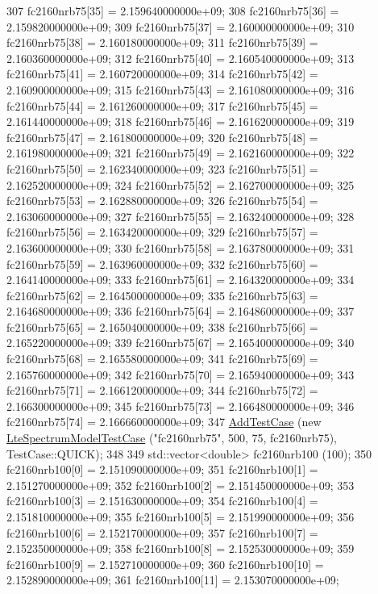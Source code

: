 \begin{DoxyCode}
307   fc2160nrb75[35] = 2.159640000000e+09;
308   fc2160nrb75[36] = 2.159820000000e+09;
309   fc2160nrb75[37] = 2.160000000000e+09;
310   fc2160nrb75[38] = 2.160180000000e+09;
311   fc2160nrb75[39] = 2.160360000000e+09;
312   fc2160nrb75[40] = 2.160540000000e+09;
313   fc2160nrb75[41] = 2.160720000000e+09;
314   fc2160nrb75[42] = 2.160900000000e+09;
315   fc2160nrb75[43] = 2.161080000000e+09;
316   fc2160nrb75[44] = 2.161260000000e+09;
317   fc2160nrb75[45] = 2.161440000000e+09;
318   fc2160nrb75[46] = 2.161620000000e+09;
319   fc2160nrb75[47] = 2.161800000000e+09;
320   fc2160nrb75[48] = 2.161980000000e+09;
321   fc2160nrb75[49] = 2.162160000000e+09;
322   fc2160nrb75[50] = 2.162340000000e+09;
323   fc2160nrb75[51] = 2.162520000000e+09;
324   fc2160nrb75[52] = 2.162700000000e+09;
325   fc2160nrb75[53] = 2.162880000000e+09;
326   fc2160nrb75[54] = 2.163060000000e+09;
327   fc2160nrb75[55] = 2.163240000000e+09;
328   fc2160nrb75[56] = 2.163420000000e+09;
329   fc2160nrb75[57] = 2.163600000000e+09;
330   fc2160nrb75[58] = 2.163780000000e+09;
331   fc2160nrb75[59] = 2.163960000000e+09;
332   fc2160nrb75[60] = 2.164140000000e+09;
333   fc2160nrb75[61] = 2.164320000000e+09;
334   fc2160nrb75[62] = 2.164500000000e+09;
335   fc2160nrb75[63] = 2.164680000000e+09;
336   fc2160nrb75[64] = 2.164860000000e+09;
337   fc2160nrb75[65] = 2.165040000000e+09;
338   fc2160nrb75[66] = 2.165220000000e+09;
339   fc2160nrb75[67] = 2.165400000000e+09;
340   fc2160nrb75[68] = 2.165580000000e+09;
341   fc2160nrb75[69] = 2.165760000000e+09;
342   fc2160nrb75[70] = 2.165940000000e+09;
343   fc2160nrb75[71] = 2.166120000000e+09;
344   fc2160nrb75[72] = 2.166300000000e+09;
345   fc2160nrb75[73] = 2.166480000000e+09;
346   fc2160nrb75[74] = 2.166660000000e+09;
347   \hyperlink{classns3_1_1TestCase_a3718088e3eefd5d6454569d2e0ddd835}{AddTestCase} (\textcolor{keyword}{new} \hyperlink{classLteSpectrumModelTestCase}{LteSpectrumModelTestCase} (\textcolor{stringliteral}{"fc2160nrb75"}, 500, 75, 
      fc2160nrb75), TestCase::QUICK);
348 
349   std::vector<double> fc2160nrb100 (100);
350   fc2160nrb100[0] = 2.151090000000e+09;
351   fc2160nrb100[1] = 2.151270000000e+09;
352   fc2160nrb100[2] = 2.151450000000e+09;
353   fc2160nrb100[3] = 2.151630000000e+09;
354   fc2160nrb100[4] = 2.151810000000e+09;
355   fc2160nrb100[5] = 2.151990000000e+09;
356   fc2160nrb100[6] = 2.152170000000e+09;
357   fc2160nrb100[7] = 2.152350000000e+09;
358   fc2160nrb100[8] = 2.152530000000e+09;
359   fc2160nrb100[9] = 2.152710000000e+09;
360   fc2160nrb100[10] = 2.152890000000e+09;
361   fc2160nrb100[11] = 2.153070000000e+09;

\end{DoxyCode}
